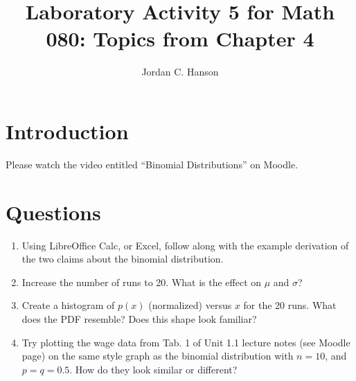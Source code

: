 \documentclass{article}
\begin{document}
\title{Laboratory Activity 5 for Math 080: Topics from Chapter 4}
\author{Jordan C. Hanson}
\maketitle

\section{Introduction}

Please watch the video entitled ``Binomial Distributions'' on Moodle.

\section{Questions}

\begin{enumerate}
\item Using LibreOffice Calc, or Excel, follow along with the example derivation of the two claims about the binomial distribution. \\ \vspace{1cm}
\item Increase the number of runs to 20.  What is the effect on $\mu$ and $\sigma$? \\ \vspace{2cm}
\item Create a histogram of $p(x)$ (normalized) versus $x$ for the 20 runs.  What does the PDF resemble?  Does this shape look familiar? \\ \vspace{3cm}
\item Try plotting the wage data from Tab. 1 of Unit 1.1 lecture notes (see Moodle page) on the same style graph as the binomial distribution with $n = 10$, and $p = q = 0.5$.  How do they look similar or different?
\end{enumerate}
\end{document}
